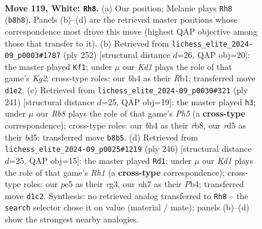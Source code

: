\documentclass[11pt]{article}
\begin{document}
\begin{figure}[p]\centering
\begin{subfigure}{0.46\textwidth}\centering
\resizebox{\linewidth}{!}{%
\newchessgame
\chessboard[
  setfen={1R6/7n/8/3rp2p/6kb/8/3p4/3K4 w - - 2 119},
  showmover=false,
  pgfstyle=straightmove, color=movearrow, markmove={b8-h8}
]}
\caption{}
\end{subfigure}\hfill
\begin{subfigure}{0.46\textwidth}\centering
\resizebox{\linewidth}{!}{%
\newchessgame
\chessboard[
  setfen={8/8/8/8/5p2/4k3/3r1pK1/1R6 w - - 2 127},
  showmover=false,
  pgfstyle=straightmove, color=movearrow, markmove={g2-f1}
]}
\caption{}
\end{subfigure}
\\[4pt]
\begin{subfigure}{0.46\textwidth}\centering
\resizebox{\linewidth}{!}{%
\newchessgame
\chessboard[
  setfen={1R6/6k1/6P1/3B4/7p/2r1p3/6P1/3R2K1 b - - 0 121},
  showmover=false,
  pgfstyle=straightmove, color=movearrow, markmove={h4-h3}
]}
\caption{}
\end{subfigure}\hfill
\begin{subfigure}{0.46\textwidth}\centering
\resizebox{\linewidth}{!}{%
\newchessgame
\chessboard[
  setfen={8/5k2/5p2/1p3p2/1P6/6r1/5r1p/1K5R w - - 6 124},
  showmover=false,
  pgfstyle=straightmove, color=movearrow, markmove={h1-d1}
]}
\caption{}
\end{subfigure}
\caption{\textbf{Move 119, White: \texttt{Rh8}.} (a) Our position; Melanie plays \texttt{Rh8} (\texttt{b8h8}). Panels (b)--(d) are the retrieved master positions whose correspondence most drove this move (highest QAP objective among those that transfer to it). (b) Retrieved from \texttt{lichess\_elite\_2024-09\_p0003\#1787} (ply 252) [structural distance $d$=26, QAP obj=20]: the master played \texttt{Kf1}; under $\mu$ our \emph{Kd1} plays the role of that game's \emph{Kg2}; cross-type roles: our \emph{b}h4 as their \emph{R}b1; transferred move \texttt{d1e2}. (c) Retrieved from \texttt{lichess\_elite\_2024-09\_p0030\#321} (ply 241) [structural distance $d$=25, QAP obj=19]: the master played \texttt{h3}; under $\mu$ our \emph{Rb8} plays the role of that game's \emph{Ph5} (a \textbf{cross-type} correspondence); cross-type roles: our \emph{b}h4 as their \emph{r}b8, our \emph{r}d5 as their \emph{b}d5; transferred move \texttt{b8b5}. (d) Retrieved from \texttt{lichess\_elite\_2024-09\_p0025\#1219} (ply 246) [structural distance $d$=25, QAP obj=15]: the master played \texttt{Rd1}; under $\mu$ our \emph{Kd1} plays the role of that game's \emph{Rh1} (a \textbf{cross-type} correspondence); cross-type roles: our \emph{p}e5 as their \emph{r}g3, our \emph{n}h7 as their \emph{P}b4; transferred move \texttt{d1c2}. Synthesis: no retrieved analog transferred to \texttt{Rh8} -- the \texttt{search} selector chose it on value (material / mate); panels (b)--(d) show the strongest nearby analogies.}
\label{fig:thought-m236}
\end{figure}
\end{document}
